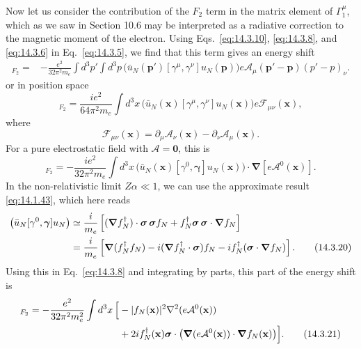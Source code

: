 Now let us consider the contribution of the $F_2$ term in the matrix element
of $\Gamma_1^\mu$, which as we saw in Section 10.6 may be interpreted as a
radiative correction to the magnetic moment of the electron. Using
Eqs.~\eqref{eq:14.3.10}, \eqref{eq:14.3.8}, and \eqref{eq:14.3.6} in
Eq.~\eqref{eq:14.3.5}, we find that this term gives an energy shift
\begin{align}
[\delta E_N]_{F_2}={}&-\frac{e^2}{32\pi^2m_e}\int d^3p'\int d^3p\,
\bigl(\bar u_N(\mathbf p')[\gamma^\mu,\gamma^\nu]u_N(\mathbf p)\bigr)
e\mathcal A_\mu(\mathbf p'-\mathbf p)(p'-p)_\nu.
\tag{14.3.16}\label{eq:14.3.16}
\end{align}
or in position space
\begin{equation}
[\delta E_N]_{F_2}=\frac{ie^2}{64\pi^2m_e}\int d^3x\,
\bigl(\bar u_N(\mathbf x)[\gamma^\mu,\gamma^\nu]u_N(\mathbf x)\bigr)
e\mathcal F_{\mu\nu}(\mathbf x),
\tag{14.3.17}\label{eq:14.3.17}
\end{equation}
where
\begin{equation}
\mathcal F_{\mu\nu}(\mathbf x)
=\partial_\mu\mathcal A_\nu(\mathbf x)-\partial_\nu\mathcal A_\mu(\mathbf x).
\tag{14.3.18}\label{eq:14.3.18}
\end{equation}
For a pure electrostatic field with $\boldsymbol{\mathcal A}= \mathbf{0}$, this is
\begin{equation}
[\delta E_N]_{F_2}=-\frac{ie^2}{32\pi^2m_e}\int d^3x\,
\bigl(\bar u_N(\mathbf x)[\gamma^0,\boldsymbol\gamma]u_N(\mathbf x)\bigr)
\cdot\boldsymbol\nabla[e\mathcal A^0(\mathbf x)].
\tag{14.3.19}\label{eq:14.3.19}
\end{equation}
In the non-relativistic limit $Z\alpha\ll1$, we can use the approximate result
\eqref{eq:14.1.43}, which here reads
\begin{align}
\bigl(\bar u_N[\gamma^0,\boldsymbol\gamma]u_N\bigr)
&\simeq\frac{i}{m_e}\left[(\boldsymbol\nabla f_N^\dagger)
\cdot\boldsymbol\sigma\,\boldsymbol\sigma f_N
+f_N^\dagger\boldsymbol\sigma\,\boldsymbol\sigma
\cdot\boldsymbol\nabla f_N\right]\notag\\
&=\frac{i}{m_e}\left[\boldsymbol\nabla(f_N^\dagger f_N)
-i(\boldsymbol\nabla f_N^\dagger\mathbin{\cdot}\boldsymbol\sigma)f_N
-if_N^\dagger(\boldsymbol\sigma\mathbin{\cdot}\boldsymbol\nabla f_N)\right].
\tag{14.3.20}\label{eq:14.3.20}
\end{align}
Using this in Eq.~\eqref{eq:14.3.8} and integrating by parts, this part of the
energy shift is
\begin{align}
[\delta E_N]_{F_2}=-\frac{e^2}{32\pi^2m_e^2}\int d^3x\,
\Bigl[&-|f_N(\mathbf x)|^2\nabla^2(e\mathcal A^0(\mathbf x))\notag\\
&+2if_N^\dagger(\mathbf x)\boldsymbol\sigma\cdot
\bigl(\boldsymbol\nabla(e\mathcal A^0(\mathbf x))
\mathbin{\cdot}\boldsymbol\nabla f_N(\mathbf x)\bigr)\Bigr].
\tag{14.3.21}\label{eq:14.3.21}
\end{align}
